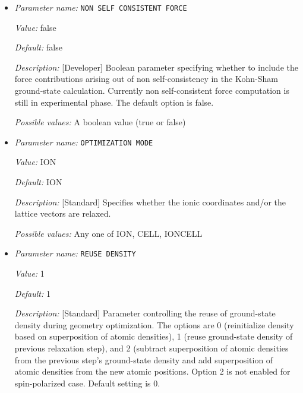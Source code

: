 \begin{itemize}
{\it Default:} 5


{\it Description:} [Standard] Sets the maximum number of line search iterations in the case of CGPRP. Default is 5.


{\it Possible values:} An integer $n$ such that $1\leq n \leq 100$
\item {\it Parameter name:} {\tt NON SELF CONSISTENT FORCE}
\label{parameters:Geometry/Optimization/NON SELF CONSISTENT FORCE}
\label{parameters:Geometry/Optimization/NON_20SELF_20CONSISTENT_20FORCE}


{\it Value:} false


{\it Default:} false


{\it Description:} [Developer] Boolean parameter specifying whether to include the force contributions arising out of non self-consistency in the Kohn-Sham ground-state calculation. Currently non self-consistent force computation is still in experimental phase. The default option is false.


{\it Possible values:} A boolean value (true or false)
\item {\it Parameter name:} {\tt OPTIMIZATION MODE}
\label{parameters:Geometry/Optimization/OPTIMIZATION MODE}
\label{parameters:Geometry/Optimization/OPTIMIZATION_20MODE}


{\it Value:} ION


{\it Default:} ION


{\it Description:} [Standard] Specifies whether the ionic coordinates and/or the lattice vectors are relaxed.


{\it Possible values:} Any one of ION, CELL, IONCELL
\item {\it Parameter name:} {\tt REUSE DENSITY}
\label{parameters:Geometry/Optimization/REUSE DENSITY}
\label{parameters:Geometry/Optimization/REUSE_20DENSITY}


{\it Value:} 1


{\it Default:} 1


{\it Description:} [Standard] Parameter controlling the reuse of ground-state density during geometry optimization. The options are 0 (reinitialize density based on superposition of atomic densities), 1 (reuse ground-state density of previous relaxation step), and 2 (subtract superposition of atomic densities from the previous step's ground-state density and add superposition of atomic densities from the new atomic positions. Option 2 is not enabled for spin-polarized case. Default setting is 0.



\end{itemize}
